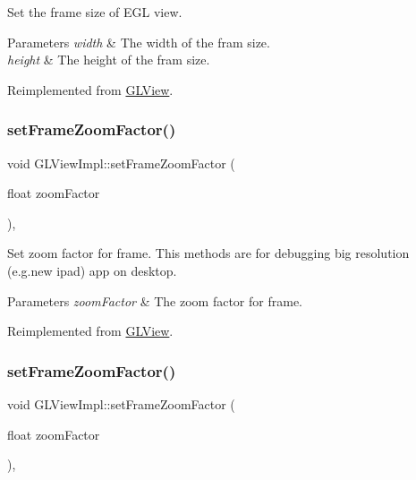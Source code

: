 Set the frame size of E\+GL view.


\begin{DoxyParams}{Parameters}
{\em width} & The width of the fram size. \\
\hline
{\em height} & The height of the fram size. \\
\hline
\end{DoxyParams}


Reimplemented from \hyperlink{classGLView_ac18f93506550c54c119f7ae87f33f220}{G\+L\+View}.

\mbox{\label{classGLViewImpl_aa8868ddca63e739ecfc2beeeaa61c1dd}} 
\subsubsection{\texorpdfstring{set\+Frame\+Zoom\+Factor()}{setFrameZoomFactor()}\hspace{0.1cm}{\footnotesize\ttfamily [1/4]}}
{\footnotesize\ttfamily void G\+L\+View\+Impl\+::set\+Frame\+Zoom\+Factor (\begin{DoxyParamCaption}\item[{float}]{zoom\+Factor }\end{DoxyParamCaption})\hspace{0.3cm}{\ttfamily [override]}, {\ttfamily [virtual]}}

Set zoom factor for frame. This methods are for debugging big resolution (e.\+g.\+new ipad) app on desktop.


\begin{DoxyParams}{Parameters}
{\em zoom\+Factor} & The zoom factor for frame. \\
\hline
\end{DoxyParams}


Reimplemented from \hyperlink{classGLView_afe38f42b6954c9bc29382f411b49f448}{G\+L\+View}.

\mbox{\label{classGLViewImpl_aa8868ddca63e739ecfc2beeeaa61c1dd}} 
\subsubsection{\texorpdfstring{set\+Frame\+Zoom\+Factor()}{setFrameZoomFactor()}\hspace{0.1cm}{\footnotesize\ttfamily [2/4]}}
{\footnotesize\ttfamily void G\+L\+View\+Impl\+::set\+Frame\+Zoom\+Factor (\begin{DoxyParamCaption}\item[{float}]{zoom\+Factor }\end{DoxyParamCaption})\hspace{0.3cm}{\ttfamily [override]}, {\ttfamily [virtual]}}

